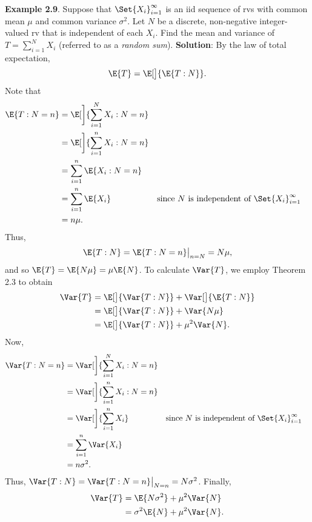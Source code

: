 \begin{Example}
    \textbf{Example 2.9}. Suppose that $ \Set{X_i}_{i=1}^\infty $ is an iid sequence of rvs with common mean $ \mu $
    and common variance $ \sigma^2 $. Let $ N $ be a discrete, non-negative integer-valued rv that
    is independent of each $ X_i $. Find the mean and variance of $ T=\sum_{i=1}^{N} X_i $
    (referred to as a \emph{random sum}).
    \tcblower{}
    \textbf{Solution}: By the law of total expectation,
    \[ \E{T}=\E[\big]{\E{T\given N}}. \]
    Note that
    \begin{align*}
        \E{T\given N=n}
         & =\E[\bigg]{\sum_{i=1}^{N} X_i\given N=n}                                                                      \\
         & =\E[\bigg]{\sum_{i=1}^{n} X_i\given N=n}                                                                      \\
         & =\sum_{i=1}^{n} \E{X_i\given N=n}                                                                             \\
         & =\sum_{i=1}^{n} \E{X_i}                  &  & \text{since $ N $ is independent of $ \Set{X_i}_{i=1}^\infty $} \\
         & =n \mu.
    \end{align*}
    Thus,
    \[ \E{T\given N}=\E{T\given N=n}\big\rvert_{n=N}=N\mu, \]
    and so $ \E{T}=\E{N\mu}=\mu\E{N} $. To calculate $ \Var{T} $, we employ Theorem 2.3 to obtain
    \begin{align*}
        \Var{T}
         & =\E[\big]{\Var{T\given N}}+\Var[\big]{\E{T\given N}} \\
         & =\E[\big]{\Var{T\given N}}+\Var{N\mu}                \\
         & =\E[\big]{\Var{T\given N}}+\mu^2\Var{N}.
    \end{align*}
    Now,
    \begin{align*}
        \Var{T\given N=n}
         & =\Var[\bigg]{\sum_{i=1}^{N} X_i\given N=n}                                                                      \\
         & =\Var[\bigg]{\sum_{i=1}^{n}X_i\given N=n }                                                                      \\
         & =\Var[\bigg]{\sum_{i=1}^{n} X_i}           &  & \text{since $ N $ is independent of $ \Set{X_i}_{i=1}^\infty $} \\
         & =\sum_{i=1}^{n} \Var{X_i}                                                                                       \\
         & =n\sigma^2.
    \end{align*}
    Thus, $ \Var{T\given N}=\Var{T\given N=n}\big\rvert_{N=n}=N\sigma^2 $. Finally,
    \begin{align*}
        \Var{T} & =\E{N\sigma^2}+\mu^2\Var{N}  \\
                & =\sigma^2\E{N}+\mu^2\Var{N}.
    \end{align*}
\end{Example}
